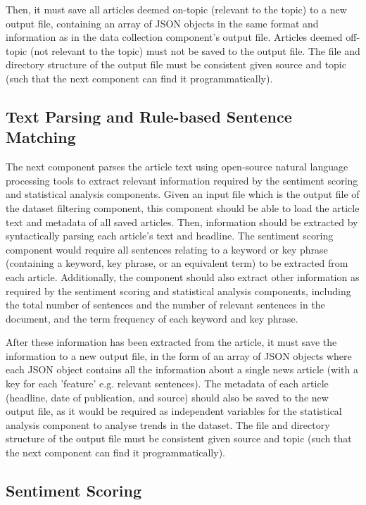 \documentclass{report}
\begin{document}
Then, it must save all articles deemed on-topic (relevant to the topic) to a new output file, containing an array of JSON objects in the same format and information as in the data collection component's output file.
Articles deemed off-topic (not relevant to the topic) must not be saved to the output file.
The file and directory structure of the output file must be consistent given source and topic (such that the next component can find it programmatically).

\subsection{Text Parsing and Rule-based Sentence Matching} \label{req-matching}

The next component parses the article text using open-source natural language processing tools to extract relevant information required by the sentiment scoring and statistical analysis components.
Given an input file which is the output file of the dataset filtering component, this component should be able to load the article text and metadata of all saved articles.
Then, information should be extracted by syntactically parsing each article's text and headline.
The sentiment scoring component would require all sentences relating to a keyword or key phrase (containing a keyword, key phrase, or an equivalent term) to be extracted from each article.
Additionally, the component should also extract other information as required by the sentiment scoring and statistical analysis components, including the total number of sentences and the number of relevant sentences in the document, and the term frequency of each keyword and key phrase.

After these information has been extracted from the article, it must save the information to a new output file, in the form of an array of JSON objects where each JSON object contains all the information about a single news article (with a key for each 'feature' e.g. relevant sentences).
The metadata of each article (headline, date of publication, and source) should also be saved to the new output file, as it would be required as independent variables for the statistical analysis component to analyse trends in the dataset.
The file and directory structure of the output file must be consistent given source and topic (such that the next component can find it programmatically).

\subsection{Sentiment Scoring} \label{req-sentiment}
\end{document}

